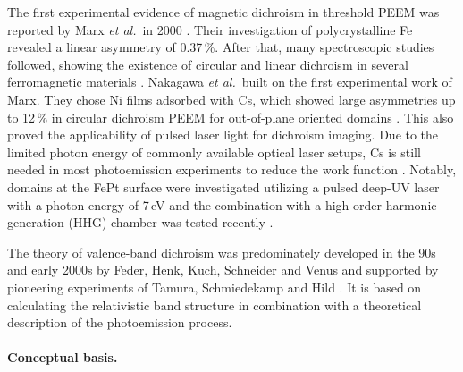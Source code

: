 \documentclass[prl,twocolumn,floatfix]{revtex4-2}
\begin{document}
 The first experimental evidence of magnetic dichroism in threshold PEEM was reported by Marx \textit{et al.}\ in 2000 \cite{marx2000}. Their investigation of polycrystalline Fe revealed a linear asymmetry of 0.37\,\%. After that, many spectroscopic studies followed, showing the existence of circular and linear dichroism in several ferromagnetic materials \cite{nakagawa2006,hild2008,hild2009,hild2010,hild2012}. Nakagawa \textit{et al.}\ built on the first experimental work of Marx. They chose Ni films adsorbed with Cs, which showed large asymmetries up to 12\,\% in circular dichroism PEEM for out-of-plane oriented domains \cite{nakagawa2007,nakagawa2009,nakagawa2012}. This also proved the applicability of pulsed laser light for dichroism imaging. Due to the limited photon energy of commonly available optical laser setups, Cs is still needed in most photoemission experiments to reduce the work function \cite{kronseder2011, meier2017}. Notably, domains at the FePt surface were investigated utilizing a pulsed deep-UV laser with a photon energy of 7\,eV \cite{zhao2019} and the combination with a high-order harmonic generation (HHG) chamber was tested recently \cite{zheng2021}.

The theory of valence-band dichroism was predominately developed in the 90s and early 2000s by Feder, Henk, Kuch, Schneider and Venus \cite{feder1996,henk1996,kuch1996a,kuch2001,venus1994,venus1997} and supported by pioneering experiments of Tamura, Schmiedekamp and Hild \cite{hild2008, hild2009, hild2010, tamura1987, schmiedeskamp1988}. It is based on calculating the relativistic band structure in combination with a theoretical description of the photoemission process.



\paragraph{Conceptual basis.} 
\end{document}

